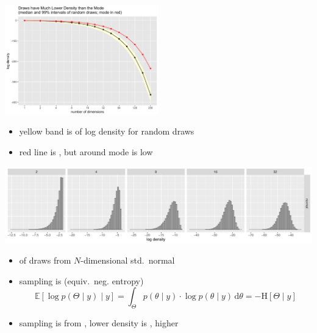 \documentclass[9pt]{report}
\begin{document}
\begin{center}
  \includegraphics[width=0.5\textwidth]{img/99pct-mode-std-normal.png}
\end{center}
\begin{itemize}
\item yellow band is  of log density for random draws
\item red line is , but  around mode is low
\end{itemize}

\vspace*{-12pt}
\begin{center}
\hspace*{2em}\includegraphics[width=\textwidth]{img/normal-posterior-log-density.pdf}
\end{center}
\vspace*{-12pt}
\begin{itemize}
\item
   of draws from $N$-dimensional std.\ normal
\item sampling is  (equiv.\ neg. entropy)
  \[
    \mathbb{E}\!\left[\log p(\Theta \mid y) \mid y\right]
    =
    \int_{\Theta} p(\theta \mid y) \cdot \log p(\theta \mid y) \, \textrm{d}\theta
    = -\textrm{H}[\Theta \mid y]
  \]
\item sampling is from , lower density is , higher 
\end{itemize}
\end{document}
